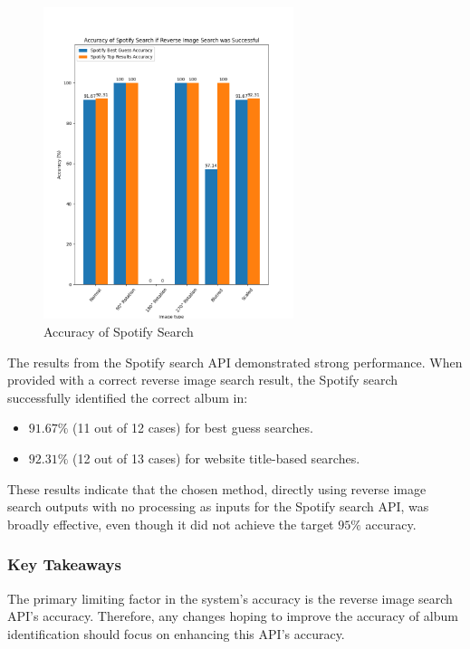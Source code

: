 \begin{figure} [H]
    \centering
    \includegraphics[width=0.65\textwidth]{figures/evaluation_graphs_spotify.png}
    \caption{Accuracy of Spotify Search}
    \label{fig:album-scanning-results-spotify}
\end{figure}

The results from the Spotify search API demonstrated strong performance. When provided with a correct reverse image search result, the Spotify search successfully identified the correct album in:

\begin{itemize}
    \item $91.67\%$ (11 out of 12 cases) for best guess searches.
    \item $92.31\%$ (12 out of 13 cases) for website title-based searches.
\end{itemize}

These results indicate that the chosen method, directly using reverse image search outputs with no processing as inputs for the Spotify search API, was broadly effective, even though it did not achieve the target $95\%$ accuracy.

\subsubsection{Key Takeaways}
The primary limiting factor in the system's accuracy is the reverse image search API's accuracy. Therefore, any changes hoping to improve the accuracy of album identification should focus on enhancing this API's accuracy.

